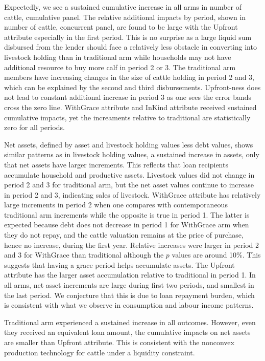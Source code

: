 	Expectedly, we see a sustained cumulative increase in all arms in \textsf{number of cattle, cumulative} panel. The relative additional impacts by period, shown in \textsf{number of cattle, concurrent} panel, are found to be large with the \textsf{Upfront} attribute especially in the first period. This is no surprise as a large liquid sum disbursed from the lender should face a relatively less obstacle in converting into livestock holding than in \textsf{traditional} arm while households may not have additional resource to buy more calf in period 2 or 3. The \textsf{traditional} arm members have increasing changes in the size of cattle holding in period 2 and 3, which can be explained by the second and third disbursements. \textsf{Upfront}-ness does not lead to constant additional increase in period 3 as one sees the error bands cross the zero line. \textsf{WithGrace} attribute and \textsf{InKind} attribute received sustained cumulative impacts, yet the increaments relative to \textsf{traditional} are statistically zero for all periods. 

	Net assets, defined by asset and livestock holding values less debt values, shows similar patterns as in livestock holding values, a sustained increase in assets, only that net assets have larger increments. This reflects that loan recipients accumulate household and productive assets. Livestock values did not change in period 2 and 3 for \textsf{traditional} arm, but the net asset values continue to increase in period 2 and 3, indicating sales of livestock. \textsf{WithGrace} attribute has relatively large increments in period 2 when one compares with contemporaneous \textsf{traditional} arm increments while the opposite is true in period 1. The latter is expected because debt does not decrease in period 1 for \textsf{WithGrace} arm when they do not repay, and the cattle valuation remains at the price of purchase, hence no increase, during the first year. Relative increases were larger in period 2 and 3 for \textsf{WithGrace} than \textsf{traditional} although the $p$ values are around 10\%. This suggests that having a grace period helps accumulate assets. The \textsf{Upfront} attribute has the larger asset accumulation relative to \textsf{traditional} in period 1. In all arms, net asset increments are large during first two periods, and smallest in the last period. We conjecture that this is due to loan repayment burden, which is consistent with what we observe in consumption and labour income patterns. 

	\textsf{Traditional} arm experienced a sustained increase in all outcomes. However, even they received an equivalent loan amount, the cumulative impacts on net assets are smaller than \textsf{Upfront} attribute. This is consistent with the nonconvex production technology for cattle under a liquidity constraint. 

